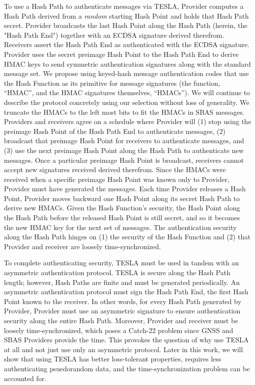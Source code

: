 \documentclass[APA,STIX1COL]{IONjournal/ION-APA Template}
\begin{document}
		To use a Hash Path to authenticate messages via TESLA, Provider computes a Hash Path derived from a {\em random} starting Hash Point and holds that Hash Path secret.
		Provider broadcasts the last Hash Point along the Hash Path (herein, the "Hash Path End") together with an ECDSA signature derived therefrom.
		Receivers assert the Hash Path End as authenticated with the ECDSA signature.
		Provider uses the secret preimage Hash Point to the Hash Path End to derive HMAC keys to send symmetric authentication signatures along with the standard message set.
		We propose using keyed-hash message authentication codes that use the Hash Function as its primitive for message signatures (the function, ``HMAC'', and the HMAC signatures themselves, ``HMACs''). 
		We will continue to describe the protocol concretely using our selection without loss of generality.
		We truncate the HMACs to the left most bits to fit the HMACs in SBAS messages.
		Providers and receivers agree on a schedule where Provider will (1) stop using the preimage Hash Point of the Hash Path End to authenticate messages, (2) broadcast that preimage Hash Point for receivers to authenticate messages, and (3) use the next preimage Hash Point along the Hash Path to authenticate new messages.
		Once a particular preimage Hash Point is broadcast, receivers cannot accept new signatures received derived therefrom.
		Since the HMACs were received when a specific preimage Hash Point was known only to Provider, Provider must have generated the messages.
		Each time Provider releases a Hash Point, Provider moves backward one Hash Point along its secret Hash Path to derive new HMACs.
		Given the Hash Function's security, the Hash Point along the Hash Path before the released Hash Point is still secret, and so it becomes the new HMAC key for the next set of messages.
		The authentication security along the Hash Path hinges on (1) the security of the Hash Function and (2) that Provider and receiver are loosely time-synchronized.

		To complete authenticating security, TESLA must be used in tandem with an asymmetric authentication protocol.
		TESLA is secure along the Hash Path length; however, Hash Paths are finite and must be generated periodically.
		An asymmetric authentication protocol must sign the Hash Path End, the first Hash Point known to the receiver.
		In other words, for every Hash Path generated by Provider, Provider must use an asymmetric signature to ensure authentication security along the entire Hash Path.
		Moreover, Provider and receiver must be loosely time-synchronized, which poses a Catch-22 problem since GNSS and SBAS Providers provide the time.
		This provokes the question of why use TESLA at all and not just use only an asymmetric protocol.
		Later in this work, we will show that using TESLA has better loss-tolerant properties, requires less authenticating psuedorandom data, and the time-synchronization problem can be accounted for.
\end{document}

